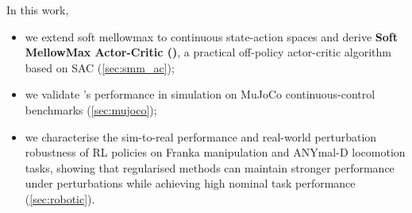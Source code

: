 In this work,
\begin{itemize}[leftmargin=*, nosep]
\item we extend soft mellowmax to continuous state-action spaces and derive \textbf{Soft MellowMax Actor-Critic (\ourMethod)}, a practical off-policy actor-critic algorithm based on SAC (\autoref{sec:smm_ac});
\item we validate \ourMethod's performance in simulation on MuJoCo continuous-control benchmarks (\autoref{sec:mujoco});
\item we characterise the sim-to-real performance and real-world perturbation robustness of RL policies on Franka manipulation and ANYmal-D locomotion tasks, showing that regularised methods can maintain stronger performance under perturbations while achieving high nominal task performance (\autoref{sec:robotic}).
\end{itemize}
